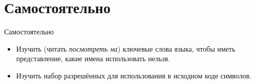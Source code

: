     \section{Самостоятельно}
    \begin{frame}{Самостоятельно}
        \begin{itemize}
            \item Изучить (читать \textit{посмотреть на}) ключевые слова языка,
                чтобы иметь представление, какие имена использовать нельзя.
            \item Изучить набор разрешённых для использования в исходном коде символов.
        \end{itemize}
    \end{frame}

